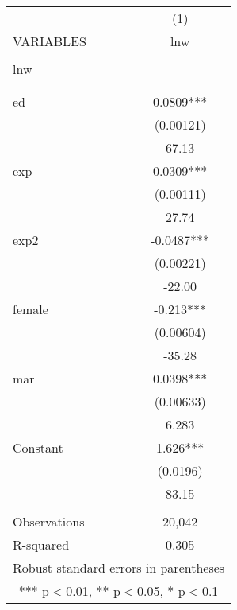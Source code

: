 \begin{tabular}{lc} \hline
 & (1) \\
VARIABLES & lnw \\ \hline
 &  \\
lnw &  \\
 &  \\
 &  \\
ed & 0.0809*** \\
 & (0.00121) \\
 & 67.13 \\
exp & 0.0309*** \\
 & (0.00111) \\
 & 27.74 \\
exp2 & -0.0487*** \\
 & (0.00221) \\
 & -22.00 \\
female & -0.213*** \\
 & (0.00604) \\
 & -35.28 \\
mar & 0.0398*** \\
 & (0.00633) \\
 & 6.283 \\
Constant & 1.626*** \\
 & (0.0196) \\
 & 83.15 \\
 &  \\
Observations & 20,042 \\
 R-squared & 0.305 \\ \hline
\multicolumn{2}{c}{ Robust standard errors in parentheses} \\
\multicolumn{2}{c}{ *** p$<$0.01, ** p$<$0.05, * p$<$0.1} \\
\end{tabular}
